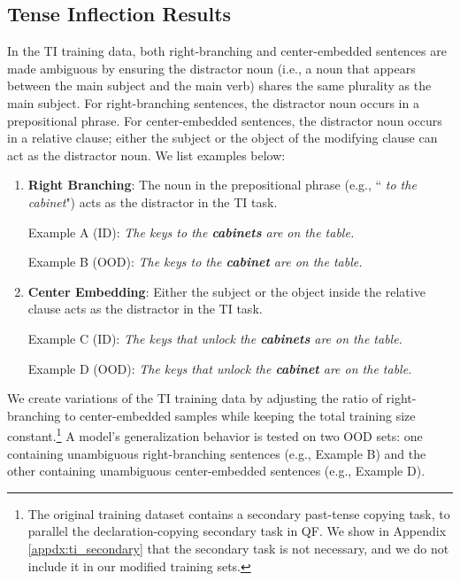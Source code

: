 \subsection{Tense Inflection Results}
\label{sec:ti_result}

In the TI training data, both right-branching and center-embedded sentences are made ambiguous by ensuring the distractor noun (i.e., a noun that appears between the main subject and the main verb) shares the same plurality as the main subject. For right-branching sentences, the distractor noun occurs in a prepositional phrase. For center-embedded sentences, the distractor noun occurs in a relative clause; either the subject or the object of the modifying clause can act as the distractor noun. We list examples below: 

\begin{enumerate}[itemsep=2pt,labelindent=10pt,topsep=0pt,parsep=0pt,partopsep=1pt, align=left, leftmargin=*]
    \item \textbf{Right Branching}: The noun in the prepositional phrase (e.g., `` \textit{to the cabinet}") acts as the distractor in the TI task.
    
    Example A (ID): \textit{The keys to the \textbf{cabinets} are on the table.}

    Example B (OOD): \textit{The keys to the \textbf{cabinet} are on the table.}
    
    \item \textbf{Center Embedding}: Either the subject or the object inside the relative clause acts as the distractor in the TI task.

    Example C (ID): \textit{The keys that unlock the \textbf{cabinets} are on the table.}

    Example D (OOD): \textit{The keys that unlock the \textbf{cabinet} are on the table.}
    
    
\end{enumerate}
We create variations of the TI training data by adjusting the ratio of right-branching to center-embedded samples while keeping the total training size constant.\footnote{The original training dataset contains a secondary past-tense copying task, to parallel the declaration-copying secondary task in QF. We show in Appendix \ref{appdx:ti_secondary} that the secondary task is not necessary, and we do not include it in our modified training sets.} A model's generalization behavior is tested on two OOD sets: one containing unambiguous right-branching sentences (e.g., Example B) and the other containing unambiguous center-embedded sentences (e.g., Example D). 

